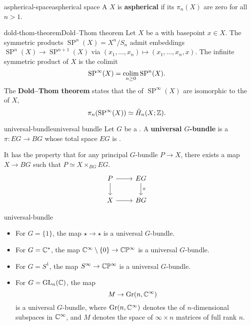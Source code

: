 \begin{topic}{aspherical-space}{aspherical space}
    A  $X$ is \textbf{aspherical} if its  $\pi_n(X)$ are zero for all $n > 1$. 
\end{topic}

\begin{topic}{dold-thom-theorem}{Dold--Thom theorem}
    Let $X$ be a   with basepoint $x \in X$. The symmetric products $\operatorname{SP}^n(X) = X^n / S_n$ admit embeddings $\operatorname{SP}^n(X) \to \operatorname{SP}^{n + 1}(X)$ via $(x_1, \ldots, x_n) \mapsto (x_1, \ldots, x_n, x)$. The infinite symmetric product of $X$ is the colimit
    \[ \operatorname{SP}^\infty(X) = \operatorname*{colim}_{n \ge 0} \operatorname{SP}^n(X) . \]
    The \textbf{Dold--Thom theorem} states that the  of $\operatorname{SP}^\infty(X)$ are isomorphic to the  of $X$,
    \[ \pi_n(\operatorname{SP}^\infty(X)) \simeq \tilde{H}_n(X; \mathbb{Z}) . \]
\end{topic}

\begin{topic}{universal-bundle}{universal bundle}
    Let $G$ be a . A \textbf{universal $G$-bundle} is a  $\pi : EG \to BG$ whose total space $EG$ is .
    
    It has the property that for any principal $G$-bundle $P \to X$, there exists a map $X \to BG$ such that $P \simeq X \times_{BG} EG$.
    \[ \begin{tikzcd}
        P \arrow{d} \arrow{r} & EG \arrow{d}{\pi} \\
        X \arrow{r} & BG
    \end{tikzcd} \]
\end{topic}

\begin{example}{universal-bundle}
    \begin{itemize}
        \item For $G = \{ 1 \}$, the map $\star \to \star$ is a universal $G$-bundle.
        \item For $G = \mathbb{C}^*$, the map $\mathbb{C}^\infty \setminus \{ 0 \} \to \mathbb{C} \mathbb{P}^\infty$ is a universal $G$-bundle.
        \item For $G = S^1$, the map $S^\infty \to \mathbb{C} \mathbb{P}^\infty$ is a universal $G$-bundle.
        \item For $G = \textup{GL}_n(\mathbb{C})$, the map
        \[ M \to \textup{Gr}(n, \mathbb{C}^\infty) \]
        is a universal $G$-bundle, where $\textup{Gr}(n, \mathbb{C}^\infty)$ denotes the  of $n$-dimensional subspaces in $\mathbb{C}^\infty$, and $M$ denotes the space of $\infty \times n$ matrices of full rank $n$.
    \end{itemize}
\end{example}

